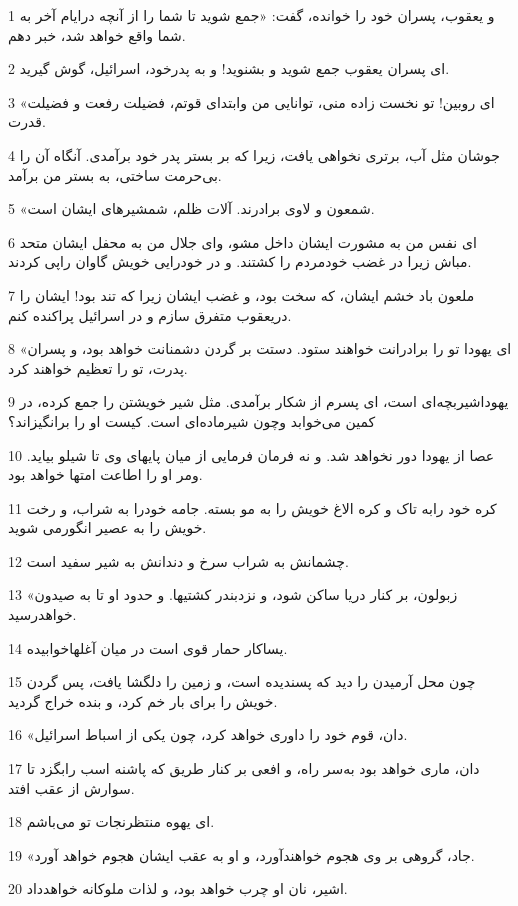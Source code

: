 \par 1 و یعقوب، پسران خود را خوانده، گفت: «جمع شوید تا شما را از آنچه درایام آخر به شما واقع خواهد شد، خبر دهم.
\par 2 ‌ای پسران یعقوب جمع شوید و بشنوید! و به پدرخود، اسرائیل، گوش گیرید.
\par 3 «ای روبین! تو نخست زاده منی، توانایی من وابتدای قوتم، فضیلت رفعت و فضیلت قدرت.
\par 4 جوشان مثل آب، برتری نخواهی یافت، زیرا که بر بستر پدر خود برآمدی. آنگاه آن را بی‌حرمت ساختی، به بستر من برآمد.
\par 5 «شمعون و لاوی برادرند. آلات ظلم، شمشیرهای ایشان است.
\par 6 ‌ای نفس من به مشورت ایشان داخل مشو، و‌ای جلال من به محفل ایشان متحد مباش زیرا در غضب خودمردم را کشتند. و در خودرایی خویش گاوان راپی کردند.
\par 7 ملعون باد خشم ایشان، که سخت بود، و غضب ایشان زیرا که تند بود! ایشان را دریعقوب متفرق سازم و در اسرائیل پراکنده کنم.
\par 8 «ای یهودا تو را برادرانت خواهند ستود. دستت بر گردن دشمنانت خواهد بود، و پسران پدرت، تو را تعظیم خواهند کرد.
\par 9 یهوداشیربچه‌ای است، ای پسرم از شکار برآمدی. مثل شیر خویشتن را جمع کرده، در کمین می‌خوابد وچون شیرماده‌ای است. کیست او را برانگیزاند؟
\par 10 عصا از یهودا دور نخواهد شد. و نه فرمان فرمایی از میان پایهای وی تا شیلو بیاید. ومر او را اطاعت امتها خواهد بود.
\par 11 کره خود رابه تاک و کره الاغ خویش را به مو بسته. جامه خودرا به شراب، و رخت خویش را به عصیر انگورمی شوید.
\par 12 چشمانش به شراب سرخ و دندانش به شیر سفید است.
\par 13 «زبولون، بر کنار دریا ساکن شود، و نزدبندر کشتیها. و حدود او تا به صیدون خواهدرسید.
\par 14 یساکار حمار قوی است در میان آغلهاخوابیده.
\par 15 چون محل آرمیدن را دید که پسندیده است، و زمین را دلگشا یافت، پس گردن خویش را برای بار خم کرد، و بنده خراج گردید.
\par 16 «دان، قوم خود را داوری خواهد کرد، چون یکی از اسباط اسرائیل.
\par 17 دان، ماری خواهد بود به‌سر راه، و افعی بر کنار طریق که پاشنه اسب رابگزد تا سوارش از عقب افتد.
\par 18 ‌ای یهوه منتظرنجات تو می‌باشم.
\par 19 «جاد، گروهی بر وی هجوم خواهند‌آورد، و او به عقب ایشان هجوم خواهد آورد.
\par 20 اشیر، نان او چرب خواهد بود، و لذات ملوکانه خواهدداد.
